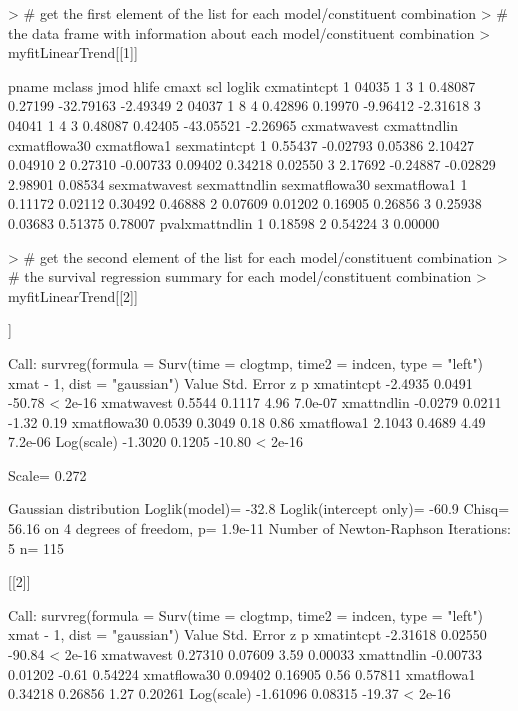 \documentclass[11pt]{article}
\begin{document}
\begin{Schunk}
\begin{Sinput}
> # get the first element of the list for each model/constituent combination
> # the data frame with information about each model/constituent combination
> myfitLinearTrend[[1]]
\end{Sinput}
\begin{Soutput}
  pname mclass jmod hlife   cmaxt     scl    loglik cxmatintcpt
1 04035      1    3     1 0.48087 0.27199 -32.79163    -2.49349
2 04037      1    8     4 0.42896 0.19970  -9.96412    -2.31618
3 04041      1    4     3 0.48087 0.42405 -43.05521    -2.26965
  cxmatwavest cxmattndlin cxmatflowa30 cxmatflowa1 sexmatintcpt
1     0.55437    -0.02793      0.05386     2.10427      0.04910
2     0.27310    -0.00733      0.09402     0.34218      0.02550
3     2.17692    -0.24887     -0.02829     2.98901      0.08534
  sexmatwavest sexmattndlin sexmatflowa30 sexmatflowa1
1      0.11172      0.02112       0.30492      0.46888
2      0.07609      0.01202       0.16905      0.26856
3      0.25938      0.03683       0.51375      0.78007
  pvalxmattndlin
1        0.18598
2        0.54224
3        0.00000
\end{Soutput}
\begin{Sinput}
> # get the second element of the list for each model/constituent combination
> # the survival regression summary for each model/constituent combination
> myfitLinearTrend[[2]]
\end{Sinput}
\begin{Soutput}
[[1]]

Call:
survreg(formula = Surv(time = clogtmp, time2 = indcen, type = "left") ~ 
    xmat - 1, dist = "gaussian")
              Value Std. Error      z       p
xmatintcpt  -2.4935     0.0491 -50.78 < 2e-16
xmatwavest   0.5544     0.1117   4.96 7.0e-07
xmattndlin  -0.0279     0.0211  -1.32    0.19
xmatflowa30  0.0539     0.3049   0.18    0.86
xmatflowa1   2.1043     0.4689   4.49 7.2e-06
Log(scale)  -1.3020     0.1205 -10.80 < 2e-16

Scale= 0.272 

Gaussian distribution
Loglik(model)= -32.8   Loglik(intercept only)= -60.9
	Chisq= 56.16 on 4 degrees of freedom, p= 1.9e-11 
Number of Newton-Raphson Iterations: 5 
n= 115 


[[2]]

Call:
survreg(formula = Surv(time = clogtmp, time2 = indcen, type = "left") ~ 
    xmat - 1, dist = "gaussian")
               Value Std. Error      z       p
xmatintcpt  -2.31618    0.02550 -90.84 < 2e-16
xmatwavest   0.27310    0.07609   3.59 0.00033
xmattndlin  -0.00733    0.01202  -0.61 0.54224
xmatflowa30  0.09402    0.16905   0.56 0.57811
xmatflowa1   0.34218    0.26856   1.27 0.20261
Log(scale)  -1.61096    0.08315 -19.37 < 2e-16


\end{Soutput}
\end{Schunk}
\end{document}
